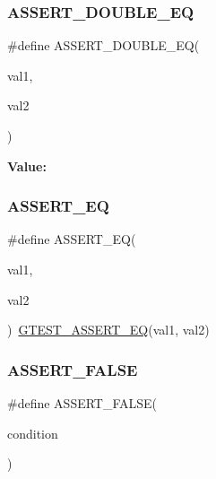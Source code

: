 \subsubsection{\texorpdfstring{ASSERT\_DOUBLE\_EQ}{ASSERT\_DOUBLE\_EQ}}
{\footnotesize\ttfamily \#define A\+S\+S\+E\+R\+T\+\_\+\+D\+O\+U\+B\+L\+E\+\_\+\+EQ(\begin{DoxyParamCaption}\item[{}]{val1,  }\item[{}]{val2 }\end{DoxyParamCaption})}

{\bfseries Value\+:}
\begin{DoxyCode}{0}

\end{DoxyCode}
\mbox{\label{_obj__test_2lib_2googletest-master_2googletest_2include_2gtest_2gtest_8h_a1a6db8b1338ee7040329322b77779086}} 
\subsubsection{\texorpdfstring{ASSERT\_EQ}{ASSERT\_EQ}}
{\footnotesize\ttfamily \#define A\+S\+S\+E\+R\+T\+\_\+\+EQ(\begin{DoxyParamCaption}\item[{}]{val1,  }\item[{}]{val2 }\end{DoxyParamCaption})~\mbox{\hyperlink{_obj__test_2lib_2googletest-release-1_88_81_2googletest_2include_2gtest_2gtest_8h_a8a7a47387090810cdfe78933d348182d}{G\+T\+E\+S\+T\+\_\+\+A\+S\+S\+E\+R\+T\+\_\+\+EQ}}(val1, val2)}

\mbox{\label{_obj__test_2lib_2googletest-master_2googletest_2include_2gtest_2gtest_8h_a8197fa52f3538588d20d8af4834c9003}} 
\subsubsection{\texorpdfstring{ASSERT\_FALSE}{ASSERT\_FALSE}}
{\footnotesize\ttfamily \#define A\+S\+S\+E\+R\+T\+\_\+\+F\+A\+L\+SE(\begin{DoxyParamCaption}\item[{}]{condition }\end{DoxyParamCaption})}

